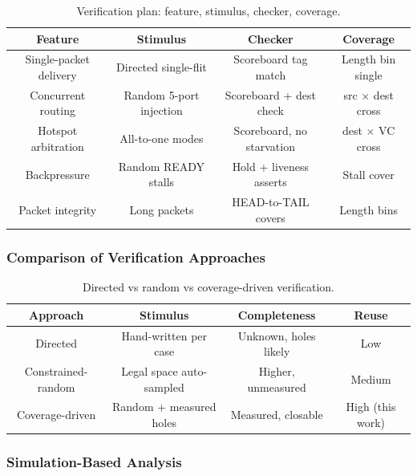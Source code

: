 \documentclass[11pt,a4paper]{report}  %
\begin{document}
\begin{table}[h!]
\centering
\caption{Verification plan: feature, stimulus, checker, coverage.}
\vspace{2mm}
\begin{tabular}{|c|c|c|c|}
\hline
\textbf{Feature} & \textbf{Stimulus} & \textbf{Checker} & \textbf{Coverage} \\ \hline
Single-packet delivery & Directed single-flit & Scoreboard tag match & Length bin single \\ \hline
Concurrent routing & Random 5-port injection & Scoreboard + dest check & src $\times$ dest cross \\ \hline
Hotspot arbitration & All-to-one modes & Scoreboard, no starvation & dest $\times$ VC cross \\ \hline
Backpressure & Random READY stalls & Hold + liveness asserts & Stall cover \\ \hline
Packet integrity & Long packets & HEAD-to-TAIL covers & Length bins \\ \hline
\end{tabular}
\label{tab:vplan}
\end{table}

\subsubsection{Comparison of Verification Approaches}

\begin{table}[h!]
\centering
\caption{Directed vs random vs coverage-driven verification.}
\vspace{2mm}
\begin{tabular}{|c|c|c|c|}
\hline
\textbf{Approach} & \textbf{Stimulus} & \textbf{Completeness} & \textbf{Reuse} \\ \hline
Directed & Hand-written per case & Unknown, holes likely & Low \\ \hline
Constrained-random & Legal space auto-sampled & Higher, unmeasured & Medium \\ \hline
Coverage-driven & Random + measured holes & Measured, closable & High (this work) \\ \hline
\end{tabular}
\label{tab:compare}
\end{table}

\subsubsection{Simulation-Based Analysis}
\end{document}
